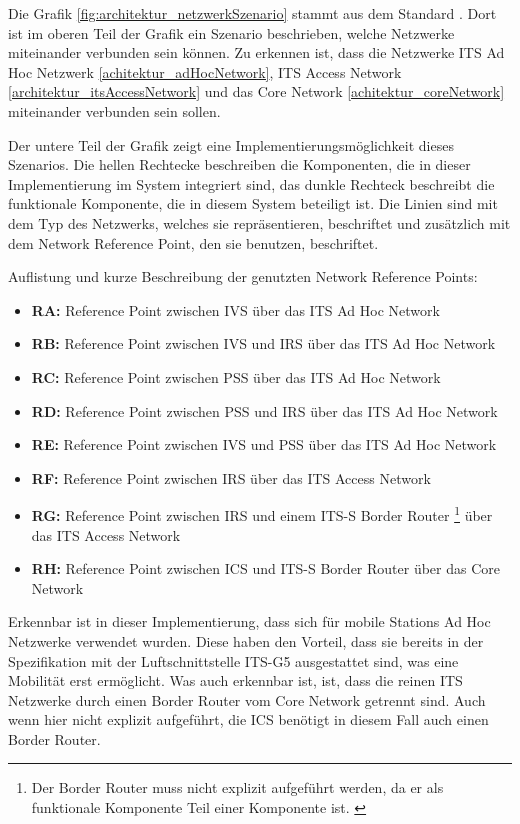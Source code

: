 Die Grafik \ref{fig:architektur_netzwerkSzenario} stammt aus dem Standard \cite{etsi302636-3}. Dort ist im oberen Teil der Grafik ein Szenario beschrieben, welche Netzwerke miteinander verbunden sein können.  Zu erkennen ist, dass die Netzwerke ITS Ad Hoc Netzwerk \ref{achitektur_adHocNetwork}, ITS Access Network \ref{architektur_itsAccessNetwork} und das Core Network  \ref{achitektur_coreNetwork} miteinander verbunden sein sollen.

Der untere Teil der Grafik zeigt eine Implementierungsmöglichkeit dieses Szenarios. Die hellen Rechtecke beschreiben die Komponenten, die in dieser Implementierung im System integriert sind, das dunkle Rechteck beschreibt die funktionale Komponente, die in diesem System beteiligt ist. Die Linien sind mit dem Typ des Netzwerks, welches sie repräsentieren, beschriftet und zusätzlich mit dem Network Reference Point, den sie benutzen, beschriftet.

Auflistung und kurze Beschreibung der genutzten Network Reference Points:
\begin{itemize}
	\item \textbf{RA: } Reference Point zwischen \ac{IVS} über das ITS Ad Hoc Network
	\item \textbf{RB: } Reference Point zwischen \ac{IVS} und \ac{IRS} über das ITS Ad Hoc Network
	\item \textbf{RC: } Reference Point zwischen \ac{PSS} über das ITS Ad Hoc Network
	\item \textbf{RD: } Reference Point zwischen \ac{PSS} und \ac{IRS} über das ITS Ad Hoc Network
	\item \textbf{RE: } Reference Point zwischen \ac{IVS} und \ac{PSS} über das ITS Ad Hoc Network
	\item \textbf{RF: } Reference Point zwischen \ac{IRS} über das ITS Access Network
	\item \textbf{RG: } Reference Point zwischen \ac{IRS} und einem ITS-S Border Router \footnote{Der Border Router muss nicht explizit aufgeführt werden, da er als funktionale Komponente Teil einer Komponente ist. \label{ftn:borderRouter}} über das ITS Access Network 
	\item \textbf{RH: } Reference Point zwischen \ac{ICS} und ITS-S Border Router  über das Core Network		
\end{itemize}

Erkennbar ist in dieser Implementierung, dass sich für mobile Stations Ad Hoc Netzwerke verwendet wurden. Diese haben den Vorteil, dass sie bereits in der Spezifikation mit der Luftschnittstelle ITS-G5 ausgestattet sind, was eine Mobilität erst ermöglicht. Was auch erkennbar ist, ist, dass die reinen ITS Netzwerke durch einen Border Router vom Core Network getrennt sind. Auch wenn hier nicht explizit aufgeführt, die \ac{ICS} benötigt in diesem Fall auch einen Border Router.

